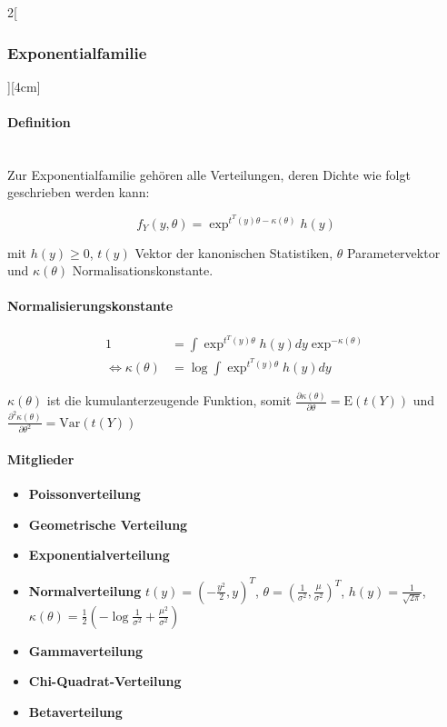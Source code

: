 \documentclass[8pt]{extarticle}
\begin{document}
\begin{multicols}{2}[\subsubsection{Exponentialfamilie}][4cm]

  \paragraph{Definition} \ \\
  \noindent Zur Exponentialfamilie gehören alle Verteilungen, deren Dichte wie folgt geschrieben werden kann:
  
  $$f_Y(y,\theta) = \exp^{t^T(y)\theta - \kappa (\theta)}h(y)$$
  
  mit $h(y) \geq 0$, $t(y)$ Vektor der kanonischen Statistiken, $\theta$ Parametervektor und $\kappa (\theta)$ Normalisationskonstante.
  
  \paragraph{Normalisierungskonstante}
  
  \begin{align*}
  1 &= \int \exp^{t^T(y)\theta}h(y)dy \exp^{ - \kappa (\theta)} \\
  \Leftrightarrow \kappa (\theta) &= \log \int \exp^{t^T(y)\theta}h(y)dy
  \end{align*}
  
  \noindent $\kappa (\theta)$ ist die kumulanterzeugende Funktion, somit $\frac{\partial\kappa(\theta)}{\partial\theta} = \mathrm{E}(t(Y))$ und $\frac{\partial^2\kappa(\theta)}{\partial\theta^2} = \mathrm{Var}(t(Y))$
  
  
  
  \paragraph{Mitglieder}
  
  \begin{itemize}
  \item \textbf{Poissonverteilung}
  \item \textbf{Geometrische Verteilung}
  \item \textbf{Exponentialverteilung}
  \item \textbf{Normalverteilung}
   $t(y) = \left(-\frac{y^2}{2},y \right)^T$,  
   $\theta = \left(\frac{1}{\sigma^2}, \frac{\mu}{\sigma^2}\right)^T$,
   $h(y) = \frac{1}{\sqrt{2\pi}}$,
   $\kappa ( \theta ) = \frac{1}{2} \left( -\log \frac{1}{\sigma^2} + \frac{\mu^2}{\sigma^2} \right)$
  \item \textbf{Gammaverteilung}
  \item \textbf{Chi-Quadrat-Verteilung}
  \item \textbf{Betaverteilung}
  \end{itemize}
  


\end{multicols}
\end{document}
